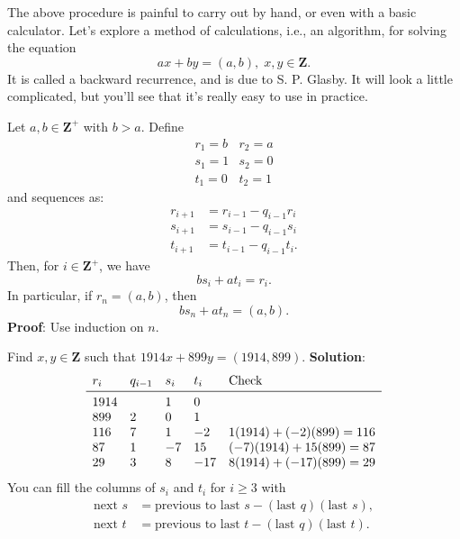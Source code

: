 The above procedure is painful to carry out by hand, or even with a basic
calculator. Let's explore a method of calculations, i.e., an algorithm, for solving
the equation
\[ ax+by=(a,b),\;x,y\in\mathbf{Z}. \]
It is called a backward recurrence, and is due to S. P. Glasby. It will look a
little complicated, but you'll see that it's really easy to use in practice.
\begin{Theorem}{}{}
    Let $ a,b\in\mathbf{Z}^+ $ with $ b>a $. Define
    \[ \begin{array}{cc}
            r_1=b & r_2=a \\
            s_1=1 & s_2=0 \\
            t_1=0 & t_2=1
        \end{array} \]
    and sequences as:
    \begin{align*}
        r_{i+1} & =r_{i-1}-q_{i-1}r_i  \\
        s_{i+1} & =s_{i-1}-q_{i-1}s_i  \\
        t_{i+1} & =t_{i-1}-q_{i-1}t_i.
    \end{align*}
    Then, for $ i\in\mathbf{Z}^+ $, we have
    \[ bs_i+at_i=r_i. \]
    In particular, if $ r_n=(a,b) $, then
    \[ bs_n+at_n=(a,b). \]
    \tcblower{}
    \textbf{Proof}: Use induction on $ n $.
\end{Theorem}
\begin{Example}{}{}
    Find $ x,y\in\mathbf{Z} $ such that $ 1914x+899y=(1914,899) $.
    \tcblower{}
    \textbf{Solution}:
    \[ \begin{array}{lllll}
            r_i  & q_{i-1} & s_i & t_i & \text{Check}          \\
            \midrule
            1914 &         & 1   & 0                           \\
            899  & 2       & 0   & 1                           \\
            116  & 7       & 1   & -2  & 1(1914)+(-2)(899)=116 \\
            87   & 1       & -7  & 15  & (-7)(1914)+15(899)=87 \\
            29   & 3       & 8   & -17 & 8(1914)+(-17)(899)=29
        \end{array} \]
    You can fill the columns of $ s_i $ and $ t_i $ for $ i\ge 3 $ with
    \begin{align*}
        \text{next }s & =\text{previous to last }s-(\text{last }q)(\text{last }s), \\
        \text{next }t & =\text{previous to last }t-(\text{last }q)(\text{last }t).
    \end{align*}
\end{Example}
